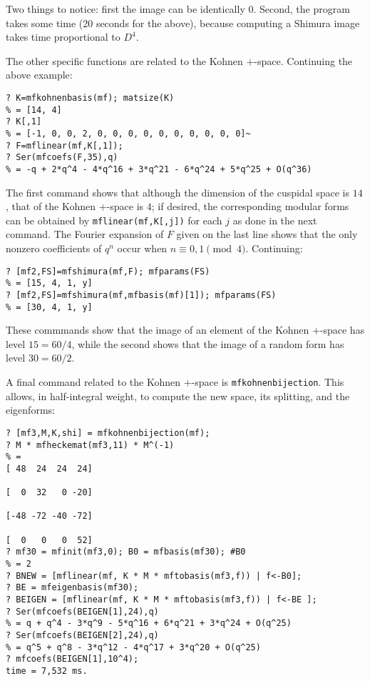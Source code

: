 \documentclass[11pt]{article}
\def\kbd#1{{\tt #1}}
\begin{document}
Two things to notice: first the image can be identically $0$.
Second, the program takes some time (20 seconds for the above), because
computing a Shimura image takes time proportional to $D^4$.

\smallskip

The other specific functions are related to the Kohnen $+$-space. Continuing
the above example:

\begin{verbatim}
? K=mfkohnenbasis(mf); matsize(K)
% = [14, 4]
? K[,1]
% = [-1, 0, 0, 2, 0, 0, 0, 0, 0, 0, 0, 0, 0, 0]~
? F=mflinear(mf,K[,1]);
? Ser(mfcoefs(F,35),q)
% = -q + 2*q^4 - 4*q^16 + 3*q^21 - 6*q^24 + 5*q^25 + O(q^36)
\end{verbatim}

The first command shows that although the dimension of the cuspidal space
is $14$, that of the Kohnen $+$-space is $4$; if desired, the corresponding
modular forms can be obtained by \kbd{mflinear(mf,K[,j])} for each $j$ as
done in the next command. The Fourier expansion of $F$ given
on the last line shows that the only nonzero coefficients of $q^n$ occur
when $n\equiv0,1\pmod4$. Continuing:

\begin{verbatim}
? [mf2,FS]=mfshimura(mf,F); mfparams(FS)
% = [15, 4, 1, y]
? [mf2,FS]=mfshimura(mf,mfbasis(mf)[1]); mfparams(FS)
% = [30, 4, 1, y]
\end{verbatim}

These commmands show that the image of an element of the Kohnen $+$-space has
level $15=60/4$, while the second shows that the image of a random form has
level $30=60/2$.

\smallskip

A final command related to the Kohnen $+$-space is \kbd{mfkohnenbijection}.
This allows, in half-integral weight, to compute the new space, its
splitting, and the eigenforms:

\begin{verbatim}
? [mf3,M,K,shi] = mfkohnenbijection(mf);
? M * mfheckemat(mf3,11) * M^(-1)
% =
[ 48  24  24  24]

[  0  32   0 -20]

[-48 -72 -40 -72]

[  0   0   0  52]
? mf30 = mfinit(mf3,0); B0 = mfbasis(mf30); #B0
% = 2
? BNEW = [mflinear(mf, K * M * mftobasis(mf3,f)) | f<-B0];
? BE = mfeigenbasis(mf30);
? BEIGEN = [mflinear(mf, K * M * mftobasis(mf3,f)) | f<-BE ];
? Ser(mfcoefs(BEIGEN[1],24),q)
% = q + q^4 - 3*q^9 - 5*q^16 + 6*q^21 + 3*q^24 + O(q^25)
? Ser(mfcoefs(BEIGEN[2],24),q)
% = q^5 + q^8 - 3*q^12 - 4*q^17 + 3*q^20 + O(q^25)
? mfcoefs(BEIGEN[1],10^4);
time = 7,532 ms.
\end{verbatim}
\end{document}
